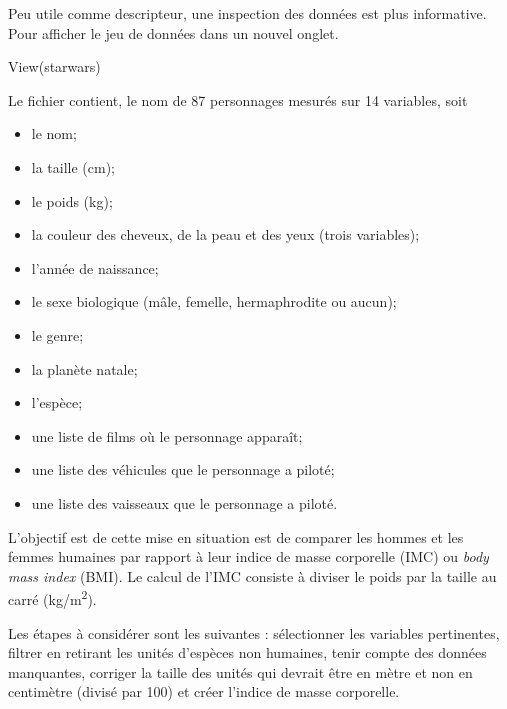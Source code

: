 \documentclass[
]{book}
\newenvironment{Shaded}{}{}
\newcommand{\FunctionTok}[1]{#1}
\newcommand{\NormalTok}[1]{#1}
\begin{document}
Peu utile comme descripteur, une inspection des données est plus informative. Pour afficher le jeu de données dans un nouvel onglet.

\begin{Shaded}
\begin{Highlighting}[]
\FunctionTok{View}\NormalTok{(starwars)}
\end{Highlighting}
\end{Shaded}

Le fichier contient, le nom de 87 personnages mesurés sur 14 variables, soit

\begin{itemize}
\item
  le nom;
\item
  la taille (cm);
\item
  le poids (kg);
\item
  la couleur des cheveux, de la peau et des yeux (trois variables);
\item
  l'année de naissance;
\item
  le sexe biologique (mâle, femelle, hermaphrodite ou aucun);
\item
  le genre;
\item
  la planète natale;
\item
  l'espèce;
\item
  une liste de films où le personnage apparaît;
\item
  une liste des véhicules que le personnage a piloté;
\item
  une liste des vaisseaux que le personnage a piloté.
\end{itemize}

L'objectif est de cette mise en situation est de comparer les hommes et les femmes humaines par rapport à leur indice de masse corporelle (IMC) ou \emph{body mass index} (BMI). Le calcul de l'IMC consiste à diviser le poids par la taille au carré (kg/m\textsuperscript{2}).

Les étapes à considérer sont les suivantes : sélectionner les variables pertinentes, filtrer en retirant les unités d'espèces non humaines, tenir compte des données manquantes, corriger la taille des unités qui devrait être en mètre et non en centimètre (divisé par 100) et créer l'indice de masse corporelle.
\end{document}
